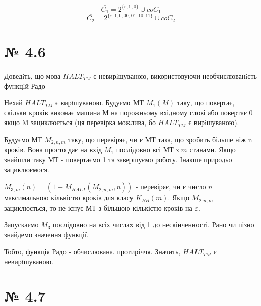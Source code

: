 \documentclass[11pt, a4paper]{article} %
\begin{document}
$$\overline{C_1} = 2^{\{\varepsilon, 1, 0\}} \cup coC_1$$
$$\overline{C_2} = 2^{\{\varepsilon, 1, 0, 00, 01, 10, 11\}} \cup coC_2$$

\section*{№ 4.6}
\begin{mdframed}
    Доведiть, що мова $HALT_{TM}$ є невирiшуваною, використовуючи
необчислюванiсть функцiй Радо
\end{mdframed}

Нехай $HALT_{TM}$ є вирiшуваною. 
Будуємо МТ $M_{1}(M)$ таку, що повертає, скільки кроків виконає машина М на порожньому вхідному слові
або повертає 0 якщо M зациклюється (ця перевірка можлива, бо $HALT_{TM}$ є вирiшуваною).

Будуємо МТ $M_{2,n,m}$ таку, що перевіряє, чи є МТ така, що зробить більше ніж n кроків.
Вона просто дає на вхід $M_1$ послідовно всі МТ з $m$ станами. 
Якщо знайшли таку МТ - повертаємо 1 та завершуємо роботу. Інакше природьо зациклюємося.

$M_{3,m}(n) = (1-M_{HALT}(M_{2,n,m}, n))$ - перевіряє, чи є число $n$ максимальною кількістю кроків для класу $K_{BB}(m)$.
Якщо $M_{2,n,m}$ зациклюється, то не існує МТ з більшою кількістю кроків на $\varepsilon$.

Запускаємо $M_3$ послідовно на всіх числах від 1 до нескінченності.
Рано чи пізно знайдемо значення функції.

Тобто, функція Радо - обчислювана. протиріччя. Значить, $HALT_{TM}$ є невирiшуваною.

\section*{№ 4.7}
\end{document}
